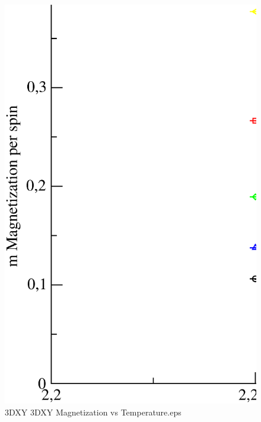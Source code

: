 \begin{figure}[!htpb]
  \centering
  \includegraphics[width=\textwidth]{./plots/3DXY/3DXY_Magnetization_vs_Temperature.eps}
  \caption{3DXY 3DXY Magnetization vs Temperature.eps}
\end{figure}

